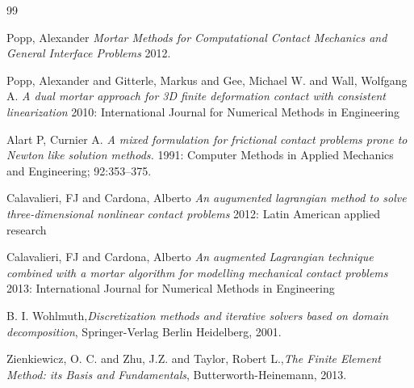 \documentclass[a4paper,10pt]{article} %
\begin{document}
\begin{thebibliography}{99}

 Popp, Alexander {\em Mortar Methods for Computational Contact Mechanics and General Interface Problems}  2012.

  Popp, Alexander and Gitterle, Markus and Gee, Michael W. and Wall, Wolfgang A. {\em A dual mortar approach for 3D finite deformation contact with consistent linearization} 2010: International Journal for Numerical Methods in Engineering

   Alart P, Curnier A.  {\em A mixed formulation for frictional contact problems prone to Newton like solution methods.} 1991: Computer Methods in Applied Mechanics and Engineering; 92:353–375.

  Calavalieri, FJ and Cardona, Alberto {\em An augumented lagrangian method to solve three-dimensional nonlinear contact problems} 2012: Latin American applied research

  Calavalieri, FJ and Cardona, Alberto {\em An augmented Lagrangian technique combined with a mortar algorithm for modelling mechanical contact problems} 2013: International Journal for Numerical Methods in Engineering

 B. I. Wohlmuth,{\em Discretization methods and iterative solvers based on domain decomposition}, Springer-Verlag Berlin Heidelberg, 2001.

 Zienkiewicz, O. C. and Zhu, J.Z. and Taylor, Robert L.,{\em The Finite Element Method: its Basis and Fundamentals}, Butterworth-Heinemann, 2013.

\end{thebibliography}
\end{document}

